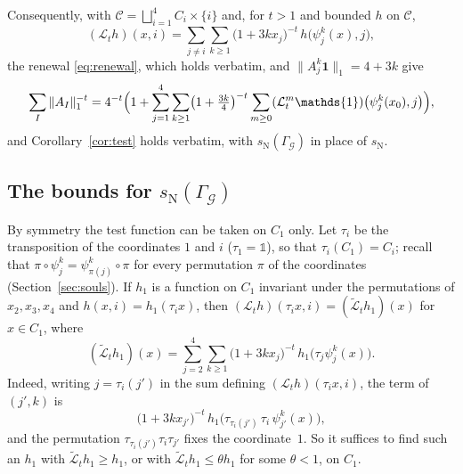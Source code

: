 \documentclass[11pt]{amsart}
\newcommand{\id}{\mathds{1}}
\theoremstyle{definition}
\theoremstyle{remark}
\newcommand{\one}{\mathbf 1}
\newcommand{\GG}{\Gamma_{\mathcal G}}
\newcommand{\sN}{s_{\mathrm N}}
\newcommand{\norm}[1]{\lVert #1\rVert}
\begin{document}
Consequently, with $\mathcal C=\bigsqcup_{i=1}^4C_i\times\{i\}$ and, for $t>1$ and bounded $h$ on $\mathcal C$,
\[
  (\mathcal L_th)(x,i)=\sum_{j\neq i}\sum_{k\ge1}\bigl(1+3kx_j\bigr)^{-t}\,h\bigl(\psi_j^k(x),j\bigr),
\]
the renewal \eqref{eq:renewal}, which holds verbatim, and $\norm{A_j^k\one}_1=4+3k$ give
\[
  \sum_I\|A_I\|_1^{-t}=4^{-t}\Bigl(1+\sum_{j=1}^4\sum_{k\ge1}\bigl(1+\tfrac{3k}4\bigr)^{-t}
  \sum_{m\ge0}(\mathcal L_t^m\mathds{1})\bigl(\psi_j^k(x_0),j\bigr)\Bigr),
\]
and Corollary~\ref{cor:test} holds verbatim, with $\sN(\GG)$ in place of $\sN$.

\subsection*{The bounds for \texorpdfstring{$\sN(\GG)$}{the norm exponent}}\label{sec:3dcert}
By symmetry the test function can be taken on $C_1$ only. Let $\tau_i$ be the transposition of the coordinates $1$ and $i$ ($\tau_1=\id$), so that $\tau_i(C_1)=C_i$; recall that $\pi\circ\psi_j^k=\psi_{\pi(j)}^k\circ\pi$ for every permutation $\pi$ of the coordinates (Section~\ref{sec:souls}). If $h_1$ is a function on $C_1$ invariant under the permutations of $x_2,x_3,x_4$ and $h(x,i)=h_1(\tau_ix)$, then $(\mathcal L_th)(\tau_ix,i)=(\tilde{\mathcal L}_th_1)(x)$ for $x\in C_1$, where
\[
  (\tilde{\mathcal L}_th_1)(x)=\sum_{j=2}^4\sum_{k\ge1}\bigl(1+3kx_j\bigr)^{-t}\,h_1\bigl(\tau_j\psi_j^k(x)\bigr).
\]
Indeed, writing $j=\tau_i(j')$ in the sum defining $(\mathcal L_th)(\tau_ix,i)$, the term of $(j',k)$ is
\[
  \bigl(1+3kx_{j'}\bigr)^{-t}\,h_1\bigl(\tau_{\tau_i(j')}\,\tau_i\,\psi_{j'}^k(x)\bigr),
\]
and the permutation $\tau_{\tau_i(j')}\tau_i\tau_{j'}$ fixes the coordinate~$1$. So it suffices to find such an $h_1$ with $\tilde{\mathcal L}_th_1\ge h_1$, or with $\tilde{\mathcal L}_th_1\le\theta h_1$ for some $\theta<1$, on $C_1$.
\end{document}
